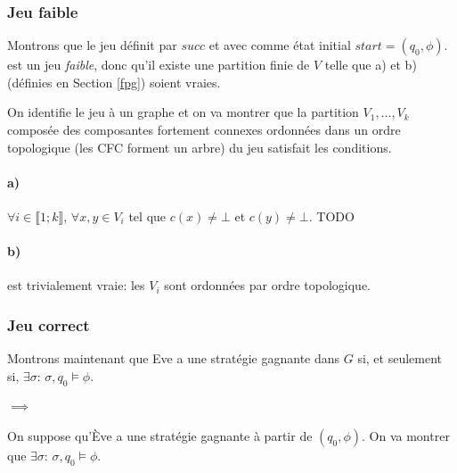 \documentclass[10pt,a4paper]{article}
\begin{document}
\subsubsection{Jeu faible}
Montrons que le jeu définit par $succ$ et avec comme état initial $start = (q_0, \phi)$.
 est un jeu \emph{faible}, donc qu'il existe une partition finie de $V$ telle que a) et b) (définies en Section \ref{fpg}) soient vraies.

On identifie le jeu à un graphe et on va montrer que la partition $V_1, \dots, V_k$ composée des composantes fortement connexes ordonnées dans un ordre topologique (les CFC forment un arbre) du jeu satisfait les conditions.

\paragraph{a)}
$\forall i \in \llbracket 1 ; k \rrbracket$, $\forall x,y \in V_i$ tel que $c(x) \neq \bot$ et $c(y) \neq \bot$. TODO

\paragraph{b)} est trivialement vraie: les $V_i$ sont ordonnées par ordre topologique.

\subsubsection{Jeu correct}
Montrons maintenant que Eve a une stratégie gagnante dans $G$ si, et seulement si, $\exists \sigma$: $\sigma,q_0 \vDash \phi$.

\paragraph{$\implies$}
On suppose qu'Ève a une stratégie gagnante à partir de $(q_0, \phi)$. On va montrer que $\exists \sigma$: $\sigma,q_0 \vDash \phi$.
\end{document}
